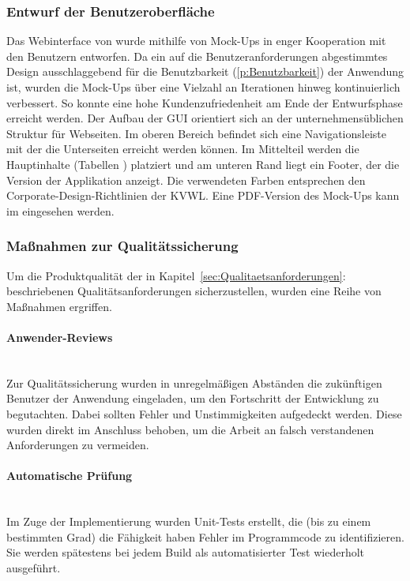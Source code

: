 \subsubsection{Entwurf der Benutzeroberfläche}
\label{sec:Benutzeroberflaeche}
Das Webinterface von \projektName wurde mithilfe von Mock-Ups in enger Kooperation mit den Benutzern entworfen. Da ein auf die Benutzeranforderungen abgestimmtes Design ausschlaggebend für die Benutzbarkeit (\ref{p:Benutzbarkeit}) der Anwendung ist, wurden die Mock-Ups über eine Vielzahl an Iterationen hinweg kontinuierlich verbessert. So konnte eine hohe Kundenzufriedenheit am Ende der Entwurfsphase erreicht werden. Der Aufbau der \ac{GUI} orientiert sich an der unternehmensüblichen Struktur für Webseiten. Im oberen Bereich befindet sich eine Navigationsleiste mit der die Unterseiten erreicht werden können. Im Mittelteil werden die Hauptinhalte (Tabellen \etc) platziert und am unteren Rand liegt ein Footer, der die Version der Applikation anzeigt. Die verwendeten Farben entsprechen den Corporate-Design-Richtlinien der \ac{KVWL}. Eine PDF-Version des Mock-Ups kann im  eingesehen werden.

\subsubsection{Maßnahmen zur Qualitätssicherung}
\label{sec:Qualitaetssicherung}
Um die Produktqualität der in Kapitel~\ref{sec:Qualitaetsanforderungen}:  beschriebenen Qualitätsanforderungen sicherzustellen, wurden eine Reihe von Maßnahmen ergriffen.

\paragraph{Anwender-Reviews} ~\\
\label{p:Reviews}
Zur Qualitätssicherung wurden in unregelmäßigen Abständen die zukünftigen Benutzer der Anwendung eingeladen, um den Fortschritt der Entwicklung zu begutachten. Dabei sollten Fehler und Unstimmigkeiten aufgedeckt werden. Diese wurden direkt im Anschluss behoben, um \zB die Arbeit an falsch verstandenen Anforderungen zu vermeiden.

\paragraph{Automatische Prüfung} ~\\
\label{p:Pruefung}
Im Zuge der Implementierung wurden Unit-Tests erstellt, die (bis zu einem bestimmten Grad) die Fähigkeit haben Fehler im Programmcode zu identifizieren. Sie werden spätestens bei jedem Build als automatisierter Test wiederholt ausgeführt.

